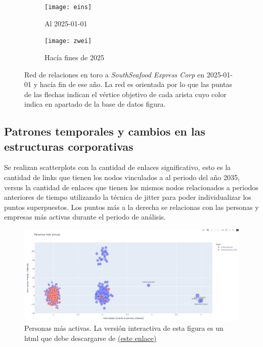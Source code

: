 \documentclass[11pt,spanish,a4paper]{article}
\begin{document}
\begin{figure}[!ht]
	\centering
	\begin{subfigure}[b]{\textwidth}
		\centering
		\texttt{[image: eins]}
		\caption{Al 2025-01-01}
		\label{fig:antes}
	\end{subfigure}
	\begin{subfigure}[b]{\textwidth}
		\centering
		\texttt{[image: zwei]}
		\caption{Hacía fines de 2025}
		\label{fig:después}
	\end{subfigure}
	\caption{
		Red de relaciones en toro a \emph{SouthSeafood Express Corp} en 2025-01-01 y hacía fin de ese año.
		La red es orientada por lo que las puntas de las flechas indican el vértice objetivo de cada arista cuyo color indica en apartado de la base de datos figura.
		}
	\label{fig:Networkx}
\end{figure}
\vspace{3cm}

\subsection{Patrones temporales y cambios en las estructuras corporativas}

Se realizan scatterplots con la cantidad de enlaces significativo, esto es la cantidad de links que tienen los nodos vinculados a al periodo del año 2035, versus la cantidad de enlaces que tienen los mismos nodos relacionados a periodos anteriores de tiempo utilizando la técnica de jitter para poder individualizar los puntos superpuestos. Los puntos más a la derecha se relacionas con las personas y empresas más activas durante el periodo de análisis.  

\begin{figure}[H]
    \centering
    \includegraphics[width=0.7\linewidth]{graphs/ejercicio_1_2.png}
    \caption{Personas más activas. La versión interactiva de esta figura es un html que debe descargarse de \href{https://github.com/bettachini/visualizacion/blob/main/vast2024/reporte/graphs/scatter_plot_degree_in_vs_out_period_persons_jitter.html.}{(este enlace)}
    }
    \label{fig:enter-label}
\end{figure}
\end{document}
